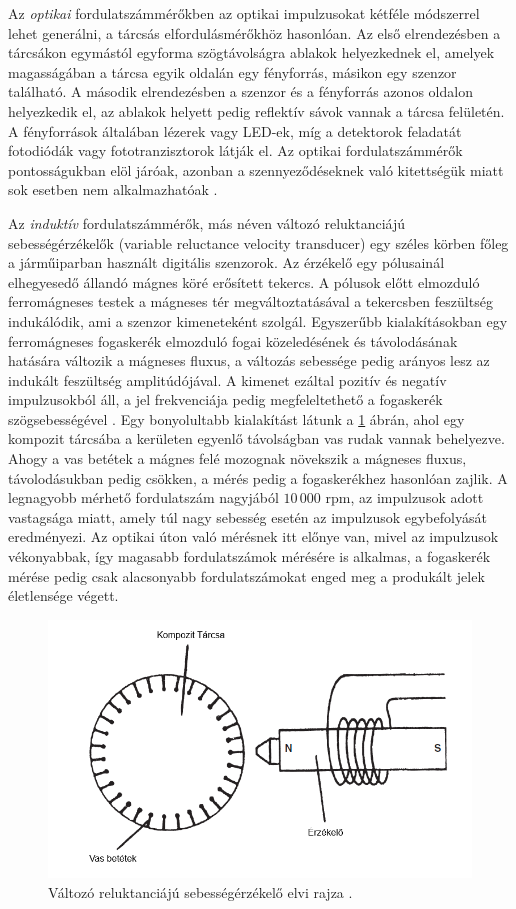 Az \textit{optikai} fordulatszámmérőkben az optikai impulzusokat kétféle módszerrel lehet generálni, a tárcsás elfordulásmérőkhöz hasonlóan. Az első elrendezésben a tárcsákon egymástól egyforma szögtávolságra ablakok helyezkednek el, amelyek magasságában a tárcsa egyik oldalán egy fényforrás, másikon egy szenzor található. A második elrendezésben a szenzor és a fényforrás azonos oldalon helyezkedik el, az ablakok helyett pedig reflektív sávok vannak a tárcsa felületén. A fényforrások általában lézerek vagy LED-ek, míg a detektorok feladatát fotodiódák vagy fototranzisztorok látják el. Az optikai fordulatszámmérők pontosságukban elöl járóak, azonban a szennyeződéseknek való kitettségük miatt sok esetben nem alkalmazhatóak \cite{Morris2016b}.

Az \textit{induktív} fordulatszámmérők, más néven változó reluktanciájú sebességérzékelők (variable reluctance velocity transducer) egy széles körben főleg a járműiparban használt digitális szenzorok. Az érzékelő egy pólusainál elhegyesedő állandó mágnes köré erősített tekercs. A pólusok előtt elmozduló ferromágneses testek a mágneses tér megváltoztatásával a tekercsben feszültség indukálódik, ami a szenzor kimeneteként szolgál. Egyszerűbb kialakításokban egy ferromágneses fogaskerék elmozduló fogai közeledésének és távolodásának hatására változik a mágneses fluxus, a változás sebessége pedig arányos lesz az indukált feszültség amplitúdójával. A kimenet ezáltal pozitív és negatív impulzusokból áll, a jel frekvenciája pedig megfeleltethető a fogaskerék szögsebességével \cite{Morris2016}. Egy bonyolultabb kialakítást látunk a \ref{vrt} ábrán, ahol egy kompozit tárcsába a kerületen egyenlő távolságban vas rudak vannak behelyezve. Ahogy a vas betétek a mágnes felé mozognak növekszik a mágneses fluxus, távolodásukban pedig csökken, a mérés pedig a fogaskerékhez hasonlóan zajlik. A legnagyobb mérhető fordulatszám nagyjából $10\,000$ rpm, az impulzusok adott vastagsága miatt, amely túl nagy sebesség esetén az impulzusok egybefolyását eredményezi. Az optikai úton való mérésnek itt előnye van, mivel az impulzusok vékonyabbak, így magasabb fordulatszámok mérésére is alkalmas, a fogaskerék mérése pedig csak alacsonyabb fordulatszámokat enged meg a produkált jelek életlensége végett.
\begin{figure}
	\centering
	\includegraphics[width=\columnwidth*8/10]{figures/vrt.png}
	\caption{Változó reluktanciájú sebességérzékelő elvi rajza \cite{Morris2016b}.}
	\label{vrt}
\end{figure}

